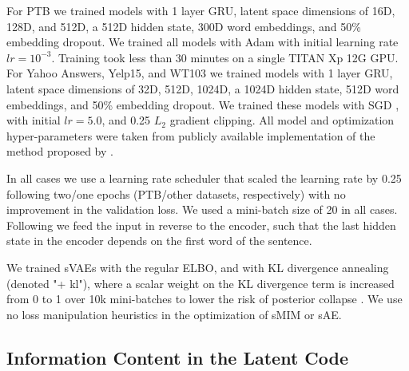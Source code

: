 \documentclass{article}
\begin{document}
For PTB we trained models with 1 layer GRU, latent space dimensions of 16D, 128D, and 512D, 
a 512D hidden state, 300D word embeddings, and 50\% embedding dropout.
We trained all models with Adam \citep{Kingma2014} with initial learning rate $lr = 10^{-3}$. 
Training took less than 30 minutes on a single TITAN Xp 12G GPU.
For Yahoo Answers, Yelp15, and WT103 we trained models with 1 layer GRU, 
latent space dimensions of 32D, 512D, 1024D, a 1024D hidden state, 512D word embeddings, 
and 50\% embedding dropout.
We trained these models with SGD \citep{pmlr-v28-sutskever13}, with initial $lr = 5.0$,
and 0.25 $L_2$ gradient clipping.
All model and optimization hyper-parameters were taken from publicly available implementation of the method proposed by \citet{DBLP:journals/corr/BowmanVVDJB15}.

In all cases we use a learning rate scheduler that scaled the learning rate by 0.25
following two/one epochs (PTB/other datasets, respectively) with no improvement in
the validation loss.
We used a mini-batch size of 20 in all cases.
Following \cite{Sutskever:2014:SSL:2969033.2969173} we feed the input in reverse 
to the encoder, such that the last hidden state in the encoder depends on the 
first word of the sentence. 

We trained sVAEs with the regular ELBO, and with KL divergence annealing 
(denoted "+ kl"), where a scalar weight on the KL divergence term 
is increased from 0 to 1 over 10k mini-batches to lower the risk of posterior 
collapse
\citep{DBLP:journals/corr/BowmanVVDJB15}.
We use no loss manipulation heuristics in the optimization of sMIM or sAE.











\subsection{Information Content in the Latent Code} \label{nlp-quantitative-results}
\end{document}
